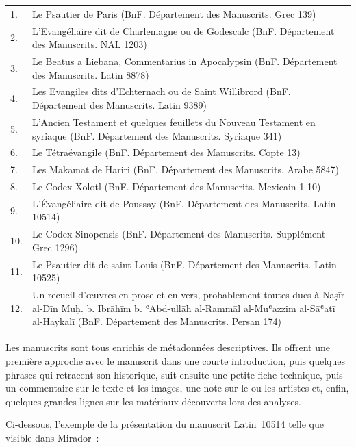 \begin{tabular}{>{\raggedright}p{0.5cm} >{\raggedright\arraybackslash}p{14cm}}
	1. & Le Psautier de Paris (BnF. Département des Manuscrits. Grec 139) \\[10pt]
	2. & L’Evangéliaire dit de Charlemagne ou de Godescalc (BnF. Département des Manuscrits. NAL 1203) \\[10pt]
	3. & Le Beatus a Liebana, Commentarius in Apocalypsin (BnF. Département des Manuscrits. Latin 8878) \\[10pt]
	4. & Les Evangiles dits d'Echternach ou de Saint Willibrord (BnF. Département des Manuscrits. Latin 9389) \\[10pt]
	5. & L’Ancien Testament et quelques feuillets du Nouveau Testament en syriaque (BnF. Département des Manuscrits. Syriaque 341) \\[10pt]
	6. & Le Tétraévangile (BnF. Département des Manuscrits. Copte 13) \\[10pt]
	7. & Les Makamat de Hariri (BnF. Département des Manuscrits. Arabe 5847) \\[10pt]
	8. & Le Codex Xolotl (BnF. Département des Manuscrits. Mexicain 1-10) \\[10pt]
	9. & L’Évangéliaire dit de Poussay (BnF. Département des Manuscrits. Latin 10514) \\[10pt]
	10. & Le Codex Sinopensis (BnF. Département des Manuscrits. Supplément Grec 1296) \\[10pt]
	11. & Le Psautier dit de saint Louis (BnF. Département des Manuscrits. Latin 10525) \\[10pt]
	12. & Un recueil d'œuvres en prose et en vers, probablement toutes dues à Naṣīr al-Dīn Muḥ. b. Ibrāhīm b. ʿAbd-ullāh al-Rammāl al-Muʿazzim al-Sāʿatī al-Haykalī (BnF. Département des Manuscrits. Persan 174) \\[10pt]
\end{tabular}

Les manuscrits sont tous enrichis de métadonnées descriptives. Ils offrent une première approche avec le manuscrit dans une courte introduction, puis quelques phrases qui retracent son historique, suit ensuite une petite fiche technique, puis un commentaire sur le texte et les images, une note sur le ou les artistes et, enfin, quelques grandes lignes sur les matériaux découverts lors des analyses. \par
Ci-dessous, l’exemple de la présentation du manuscrit Latin 10514 telle que visible dans Mirador~:\par

